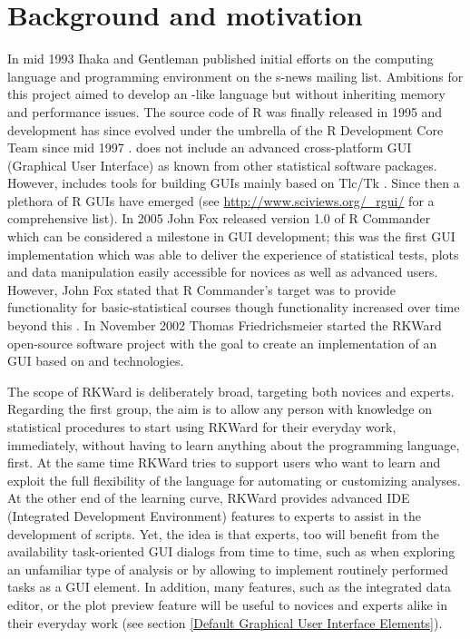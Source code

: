 \section[Background and motivation]{Background and motivation}
In mid 1993 Ihaka and Gentleman published initial efforts on the computing
language and programming environment  on the s-news mailing list. Ambitions for
this project aimed to develop an -like language but without inheriting memory
and performance issues. The source code of R was finally released in 1995 and
development has since evolved under the umbrella of the R Development Core Team
since mid 1997 \citep{RDCT2001, RDCT2010, Ihaka_Gentlemen_1993}.
 does not include an advanced cross-platform GUI (Graphical User Interface) as known from other
statistical software packages. However,  includes tools for building GUIs
mainly based on Tlc/Tk \citep{Dalgaard2001, Dalgaard2002}. Since then a
plethora of R GUIs have emerged (see \url{http://www.sciviews.org/_rgui/} for a
comprehensive list). In 2005 John Fox released version 1.0 of R Commander which
can be considered a milestone in  GUI development; this was the first GUI
implementation which was able to deliver the experience of statistical tests,
plots and data manipulation easily accessible for  novices as well as advanced
users. However, John Fox stated that R Commander's target was to provide
functionality for basic-statistical courses though functionality increased over
time beyond this \citep{Fox2005}. In November 2002 Thomas Friedrichsmeier
started the RKWard open-source software project with the goal to create an
implementation of an  GUI based on  and  technologies.

The scope of RKWard is deliberately broad, targeting both  novices and experts.
Regarding the first group, the aim is to allow any person with knowledge on
statistical procedures to start using RKWard for their everyday work,
immediately, without having to learn anything about the  programming language,
first. At the same time RKWard tries to support users who want to learn and
exploit the full flexibility of the  language for automating or customizing
analyses. At the other end of the learning curve, RKWard provides advanced IDE (Integrated Development Environment)
features to  experts to assist in the development of  scripts. Yet, the idea
is that  experts, too will benefit from the availability task-oriented GUI
dialogs from time to time, such as when exploring an unfamiliar type of analysis
or by allowing to implement routinely performed tasks as a GUI element. In
addition, many features, such as the integrated data editor, or the plot preview
feature will be useful to  novices and  experts alike in their everyday work
(see section \ref{Default Graphical User Interface Elements}).

